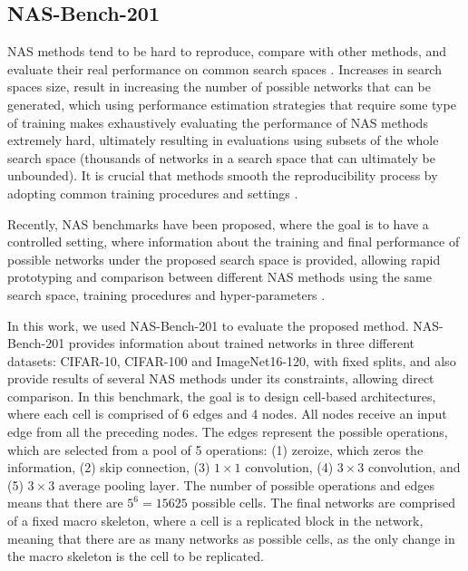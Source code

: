 \documentclass[10pt, conference]{IEEEtran}
\begin{document}
\FloatBarrier


\subsection{NAS-Bench-201}
NAS methods tend to be hard to reproduce, compare with other methods, and evaluate their real performance on common search spaces \cite{lindauer2020best}. Increases in search spaces size, result in increasing the number of possible networks that can be generated, which using performance estimation strategies that require some type of training makes exhaustively evaluating the performance of NAS methods extremely hard, ultimately resulting in evaluations using subsets of the whole search space (thousands of networks in a search space that can ultimately be unbounded). It is crucial that methods smooth the reproducibility process by adopting common training procedures and settings \cite{lindauer2020best}.

Recently, NAS benchmarks have been proposed, where the goal is to have a controlled setting, where information about the training and final performance of possible networks under the proposed search space is provided, allowing rapid prototyping and comparison between different NAS methods using the same search space, training procedures and hyper-parameters \cite{DBLP:conf/icml/YingKCR0H19, DBLP:conf/iclr/ZelaSH20, DBLP:journals/corr/abs-2008-09777,DBLP:conf/iclr/Dong020}.

In this work, we used NAS-Bench-201 \cite{DBLP:conf/iclr/Dong020} to evaluate the proposed method. NAS-Bench-201 provides information about trained networks in three different datasets: CIFAR-10, CIFAR-100 and ImageNet16-120, with fixed splits, and also provide results of several NAS methods under its constraints, allowing direct comparison. In this benchmark, the goal is to design cell-based architectures, where each cell is comprised of 6 edges and 4 nodes. All nodes receive an input edge from all the preceding nodes. The edges represent the possible operations, which are selected from a pool of 5 operations: (1) zeroize, which zeros the information, (2) skip connection, (3) $1\times1$ convolution, (4) $3\times3$ convolution, and (5) $3\times3$ average pooling layer. The number of possible operations and edges means that there are $5^6 = 15625$ possible cells. The final networks are comprised of a fixed macro skeleton, where a cell is a replicated block in the network, meaning that there are as many networks as possible cells, as the only change in the macro skeleton is the cell to be replicated.
\end{document}
